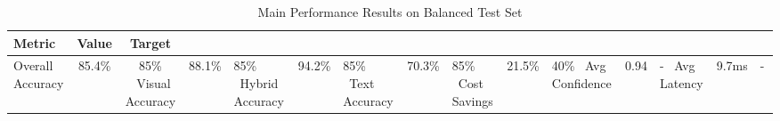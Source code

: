 \begin{table}[t]
\centering
\caption{Main Performance Results on Balanced Test Set}
\label{tab:main_results}
\begin{tabular}{lcc}
\toprule
\textbf{Metric} & \textbf{Value} & \textbf{Target} \\
\midrule
Overall Accuracy & 85.4\% & 85\% \
Visual Accuracy & 88.1\% & 85\% \
Hybrid Accuracy & 94.2\% & 85\% \
Text Accuracy & 70.3\% & 85\% \
Cost Savings & 21.5\% & 40\% \
Avg Confidence & 0.94 & - \
Avg Latency & 9.7ms & - \
\bottomrule
\end{tabular}
\end{table}